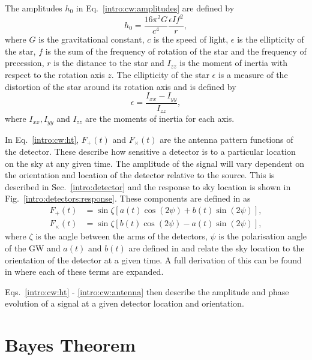 The amplitudes $h_0$ in Eq.~\ref{intro:cw:amplitudes} are defined by
\begin{equation}
    h_0 = \frac{16 \pi^2 G}{c^4} \frac{\epsilon I f^2}{r},
\end{equation}
where $G$ is the gravitational constant, $c$ is the speed of light, $\epsilon$ is the ellipticity of the star, $f$ is the sum of the frequency of rotation of the star and the frequency of precession, $r$ is the distance to the star and $I_{zz}$ is the moment of inertia with respect to the rotation axis $z$.
The ellipticity of the star $\epsilon$ is a measure of the distortion of the star around its rotation axis and is defined by
\begin{equation}
    \epsilon = \frac{I_{xx} - I_{yy}}{I_{zz}},
\end{equation}
where $I_{xx}, I_{yy}$ and $I_{zz}$ are the moments of inertia for each axis.

In Eq.~\ref{intro:cw:ht}, $F_+(t)$ and $F_{\times}(t)$ are the antenna pattern functions of the detector. 
These describe how sensitive a detector is to a particular location on the sky at any given time. 
The amplitude of the signal will vary dependent on the orientation and location of the detector relative to the source.
This is described in Sec.~\ref{intro:detector} and the response to sky location is shown in Fig.~\ref{intro:detectors:response}.
These components are defined in \citep{schutz1998DataAnalysis} as
\begin{equation}
\label{intro:cw:antenna}
\begin{split}
F_{+}(t) &= \sin{\zeta}[a(t)\cos{(2\psi)} + b(t)\sin{(2\psi)}], \\
F_{\times}(t) &= \sin{\zeta}[b(t) \cos{(2\psi)} - a(t)\sin{(2\psi)}],
\end{split}
\end{equation}
where $\zeta$ is the angle between the arms of the detectors, $\psi$ is the polarisation angle of the \gls{GW} and $a(t)$ and $b(t)$ are defined in \citep{schutz1998DataAnalysis} and relate the sky location to the orientation of the detector at a given time. 
A full derivation of this can be found in \citep{schutz1998DataAnalysis} where each of these terms are expanded.

Eqs.~\ref{intro:cw:ht} - \ref{intro:cw:antenna} then describe the amplitude and phase evolution of a signal at a given detector location and orientation.



\section{\label{intro:prob} Bayes Theorem}


